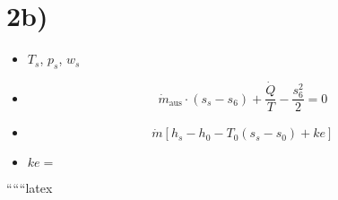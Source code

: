 

\section*{2b)}

\begin{itemize}
    \item \( T_s \), \( p_s \), \( w_s \)
    \item \[ \dot{m}_{\text{aus}} \cdot (s_s - s_6) + \frac{\dot{Q}}{T} - \frac{s_6^2}{2} = 0 \]
    \item \[ \dot{m} \left[ h_s - h_0 - T_0 (s_s - s_0) + ke \right] \]
    \item \( ke = \)
\end{itemize}

``````latex